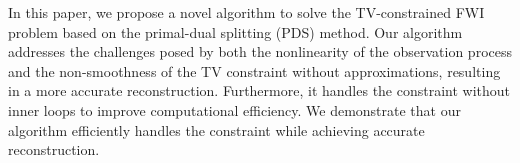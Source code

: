 In this paper, we propose a novel algorithm to solve the TV-constrained FWI problem based on the primal-dual splitting (PDS) method.
Our algorithm addresses the challenges posed by both the nonlinearity of the observation process and the non-smoothness of the TV constraint without approximations, resulting in a more accurate reconstruction.
Furthermore, it handles the constraint without inner loops to improve computational efficiency.
We demonstrate that our algorithm efficiently handles the constraint while achieving accurate reconstruction.
